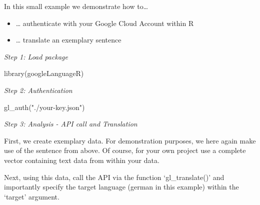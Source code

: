\documentclass[
]{book}
\newenvironment{Shaded}{\begin{snugshade}}{\end{snugshade}}
\newcommand{\AttributeTok}[1]{\textcolor[rgb]{0.77,0.63,0.00}{#1}}
\newcommand{\FunctionTok}[1]{\textcolor[rgb]{0.00,0.00,0.00}{#1}}
\newcommand{\NormalTok}[1]{#1}
\newcommand{\OtherTok}[1]{\textcolor[rgb]{0.56,0.35,0.01}{#1}}
\newcommand{\SpecialCharTok}[1]{\textcolor[rgb]{0.00,0.00,0.00}{#1}}
\newcommand{\StringTok}[1]{\textcolor[rgb]{0.31,0.60,0.02}{#1}}
\begin{document}
In this small example we demonstrate how to\ldots{}

\begin{itemize}
\item
  \ldots{} authenticate with your Google Cloud Account within R
\item
  \ldots{} translate an exemplary sentence
\end{itemize}

\emph{Step 1: Load package}

\begin{Shaded}
\begin{Highlighting}[]
\FunctionTok{library}\NormalTok{(googleLanguageR)}
\end{Highlighting}
\end{Shaded}

\emph{Step 2: Authentication}

\begin{Shaded}
\begin{Highlighting}[]
\FunctionTok{gl\_auth}\NormalTok{(}\StringTok{"./your{-}key.json"}\NormalTok{)}
\end{Highlighting}
\end{Shaded}

\emph{Step 3: Analysis - API call and Translation}

First, we create exemplary data. For demonstration purposes, we here again make use of the sentence from above. Of course, for your own project use a complete vector containing text data from within your data.

\begin{Shaded}
\end{Shaded}

Next, using this data, call the API via the function `gl\_translate()' and importantly specify the target language (german in this example) within the `target' argument.

\begin{Shaded}
\end{Shaded}
\end{document}

